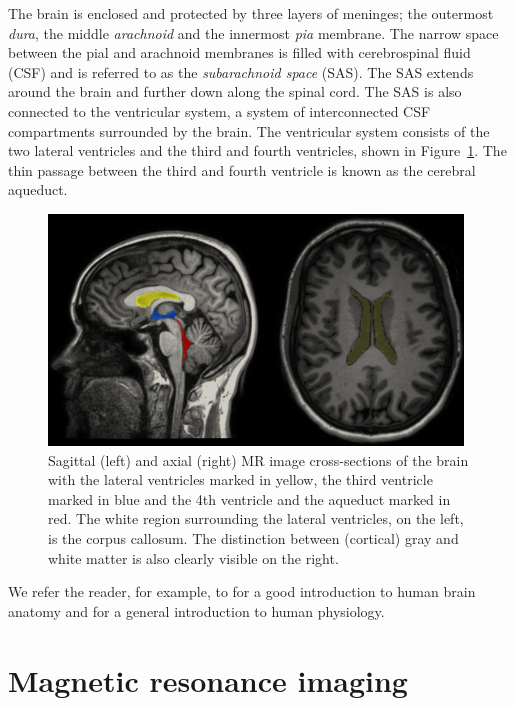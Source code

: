   The
brain is enclosed and protected by three layers of meninges; the
outermost \emph{dura}, the middle \emph{arachnoid} and the innermost
\emph{pia} membrane. The narrow space between the pial and arachnoid
membranes is filled with cerebrospinal fluid (CSF) and is referred to
as the \emph{subarachnoid space} (SAS). The SAS extends around the
brain and further down along the spinal cord. The SAS is also
connected to the ventricular system, a system of interconnected CSF
compartments surrounded by the brain. The ventricular system consists
of the two lateral ventricles and the third and fourth ventricles,
shown in Figure~\ref{fig:chp2:ventricles}. The thin passage between
the third and fourth ventricle is known as the cerebral aqueduct.
\begin{figure}
  \centering
  \includegraphics[width=0.98\textwidth]{./graphics/chp2/exp-vent.png}
  \caption{Sagittal (left) and axial (right) MR image cross-sections
    of the brain with the lateral ventricles marked in yellow, the third
    ventricle marked in blue and the 4th ventricle and the aqueduct
    marked in red. The white region surrounding the lateral
    ventricles, on the left, is the corpus callosum. The distinction
    between (cortical) gray and white matter is also clearly visible
    on the right.}
  \label{fig:chp2:ventricles}
\end{figure}

We refer the reader, for example, to \cite{gray2009gray} for a good
introduction to human brain anatomy and \cite{boron2016medical} for a
general introduction to human physiology.

\section{Magnetic resonance imaging}

